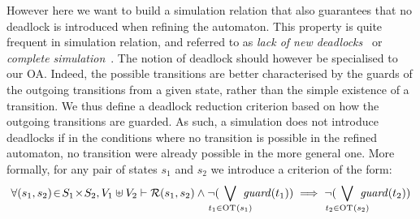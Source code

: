 \documentclass[runningheads]{llncs}
\begin{document}
%
%





However here we want to build a simulation relation that  also guarantees that no deadlock is introduced when refining the automaton. This property is quite frequent in simulation relation, and referred to as \emph{lack of new deadlocks}~\cite{Kouchnarenko:2007} or \emph{complete simulation}~\cite{sangiorgi:bisim-coind12}.
The notion of deadlock should however be specialised to our OA. Indeed, the possible transitions are better characterised by the guards of the outgoing transitions from a given state, rather than the simple existence of a transition. We thus define a deadlock reduction criterion based on how the outgoing transitions are guarded.
As such, a simulation does not introduce deadlocks if in the conditions where no transition is possible in the refined automaton, no transition were already possible in the more general one. More formally, for any pair of states $s_1$ and $s_2$  we introduce a criterion of the form: 
\[
\forall \mpar{s_1, s_2} \!\in\! S_1 \!\times\! S_2, V_1 \uplus V_2  \vdash \mathcal{R}\mpar{s_1, s_2} \wedge \lnot( \bigvee_\subbox{t_1 \in \fOT{s_1}} \fguard{t_1} )\implies \lnot( \bigvee_\subbox{t_2 \in \fOT{s_2}} \fguard{t_2}  )
\]
\end{document}
